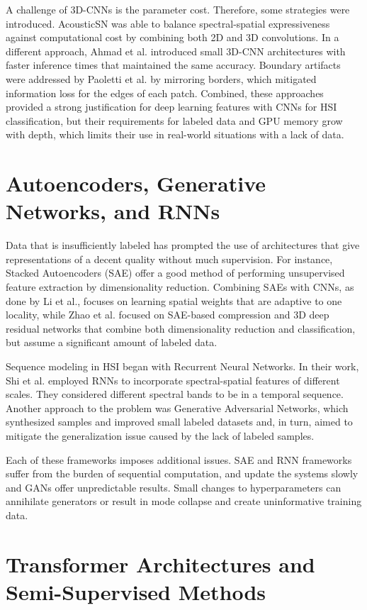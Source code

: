 A challenge of 3D-CNNs is the parameter cost. Therefore, some strategies were introduced. AcousticSN was able to balance spectral-spatial expressiveness against computational cost by combining both 2D and 3D convolutions. In a different approach, Ahmad et al. introduced small 3D-CNN architectures with faster inference times that maintained the same accuracy. Boundary artifacts were addressed by Paoletti et al. by mirroring borders, which mitigated information loss for the edges of each patch. Combined, these approaches provided a strong justification for deep learning features with CNNs for HSI classification, but their requirements for labeled data and GPU memory grow with depth, which limits their use in real-world situations with a lack of data.

\section{Autoencoders, Generative Networks, and RNNs}

Data that is insufficiently labeled has prompted the use of architectures that give representations of a decent quality without much supervision. For instance, Stacked Autoencoders (SAE) offer a good method of performing unsupervised feature extraction by dimensionality reduction. Combining SAEs with CNNs, as done by Li et al., focuses on learning spatial weights that are adaptive to one locality, while Zhao et al. focused on SAE-based compression and 3D deep residual networks that combine both dimensionality reduction and classification, but assume a significant amount of labeled data.

Sequence modeling in HSI began with Recurrent Neural Networks. In their work, Shi et al. employed RNNs to incorporate spectral-spatial features of different scales. They considered different spectral bands to be in a temporal sequence. Another approach to the problem was Generative Adversarial Networks, which synthesized samples and improved small labeled datasets and, in turn, aimed to mitigate the generalization issue caused by the lack of labeled samples.

Each of these frameworks imposes additional issues. SAE and RNN frameworks suffer from the burden of sequential computation, and update the systems slowly and GANs offer unpredictable results. Small changes to hyperparameters can annihilate generators or result in mode collapse and create uninformative training data.

\section{Transformer Architectures and Semi-Supervised Methods}

